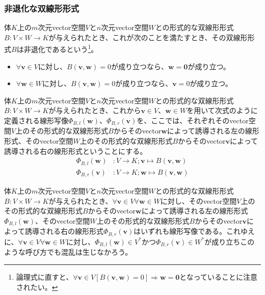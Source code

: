 \documentclass[dvipdfmx]{jsarticle}
\begin{document}
\subsubsection{非退化な双線形形式}%
\begin{dfn}
体$K$上の$m$次元vector空間$V$と$n$次元vector空間$W$との形式的な双線形形式$B:V \times W \rightarrow K$が与えられたとき、これが次のことを満たすとき、その双線形形式$B$は非退化であるという\footnote{論理式に直すと、$\forall\mathbf{v} \in V\left[ B\left( \mathbf{v},\mathbf{w} \right) = 0 \right] \Rightarrow \mathbf{w} = \mathbf{0}$となっていることに注意されたい。}。
\begin{itemize}
\item
  $\forall\mathbf{v} \in V$に対し、$B\left( \mathbf{v},\mathbf{w} \right) = 0$が成り立つなら、$\mathbf{w} = \mathbf{0}$が成り立つ。
\item
  $\forall\mathbf{w} \in W$に対し、$B\left( \mathbf{v},\mathbf{w} \right) = 0$が成り立つなら、$\mathbf{v} = 0$が成り立つ。
\end{itemize}
\end{dfn}
\begin{dfn}
体$K$上の$m$次元vector空間$V$と$n$次元vector空間$W$との形式的な双線形形式$B:V \times W \rightarrow K$が与えられたとき、これから$\mathbf{v} \in V$、$\mathbf{w} \in W$を用いて次式のように定義される線形写像$\varPhi_{B,l}\left( \mathbf{w} \right)$、$\varPhi_{B,r}\left( \mathbf{v} \right)$を、ここでは、それぞれそのvector空間$V$上のその形式的な双線形形式$B$からそのvector$\mathbf{w}$によって誘導される左の線形形式、そのvector空間$W$上のその形式的な双線形形式$B$からそのvector$\mathbf{v}$によって誘導される右の線形形式ということにする。
\begin{align*}
\varPhi_{B,l}\left( \mathbf{w} \right)&:V \rightarrow K;\mathbf{v} \mapsto B\left( \mathbf{v},\mathbf{w} \right)\\
\varPhi_{B,r}\left( \mathbf{v} \right)&:V \rightarrow K;\mathbf{w} \mapsto B\left( \mathbf{v},\mathbf{w} \right)
\end{align*}
\end{dfn}
\begin{thm}\label{2.4.3.6}
体$K$上の$m$次元vector空間$V$と$n$次元vector空間$W$との形式的な双線形形式$B:V \times W \rightarrow K$が与えられたとき、$\forall\mathbf{v} \in V\forall\mathbf{w} \in W$に対し、そのvector空間$V$上のその形式的な双線形形式$B$からそのvector$\mathbf{w}$によって誘導される左の線形形式$\varPhi_{B,l}\left( \mathbf{w} \right)$、そのvector空間$W$上のその形式的な双線形形式$B$からそのvector$\mathbf{v}$によって誘導される右の線形形式$\varPhi_{B,r}\left( \mathbf{v} \right)$はいずれも線形写像である。これゆえに、$\forall\mathbf{v} \in V\forall\mathbf{w} \in W$に対し、$\varPhi_{B,l}\left( \mathbf{w} \right) \in V^{*}$かつ$\varPhi_{B,r}\left( \mathbf{v} \right) \in W^{*}$が成り立ちこのような呼び方でも混乱は生じなかろう。
\end{thm}
\end{document}
